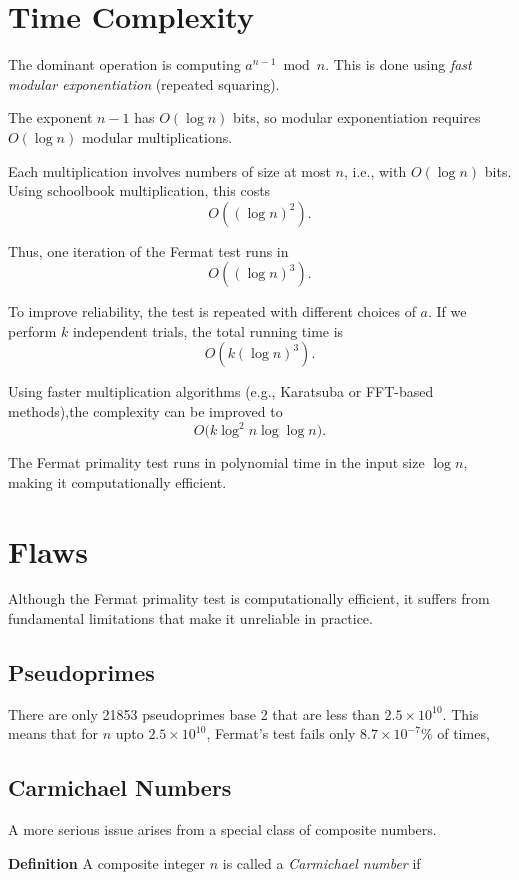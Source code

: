 \documentclass{article}
\newcommand{\bld}[1]{\textbf{#1}}
\begin{document}
\section*{Time Complexity}
The dominant operation is computing $a^{n-1} \bmod n$. This is done using
\emph{fast modular exponentiation} (repeated squaring).

The exponent $n-1$ has $O(\log n)$ bits, so modular exponentiation requires
$O(\log n)$ modular multiplications.

Each multiplication involves numbers of size at most $n$, i.e., with $O(\log n)$ bits.
Using schoolbook multiplication, this costs
\[
O((\log n)^2).
\]

Thus, one iteration of the Fermat test runs in
\[
O((\log n)^3).
\]

To improve reliability, the test is repeated with different choices of $a$.
If we perform $k$ independent trials, the total running time is
\[
O(k (\log n)^3).
\]

Using faster multiplication algorithms (e.g., Karatsuba or FFT-based methods),the complexity can be improved to
\[
O\big(k \log^2 n \log \log n\big).
\]

The Fermat primality test runs in polynomial time in the input size $\log n$, making it computationally efficient.

\section*{Flaws}

Although the Fermat primality test is computationally efficient, it suffers from
fundamental limitations that make it unreliable in practice.

\subsection*{Pseudoprimes}

There are only 21853 pseudoprimes base 2 that are less than $2.5\times10^{10}$. This means that for $n$ upto $2.5\times10^{10}$, Fermat's test fails only $8.7\times{10^{-7}}\%$ of times, 


\subsection*{Carmichael Numbers}

A more serious issue arises from a special class of composite numbers.

\bld{Definition} A composite integer $n$ is called a \emph{Carmichael number} if
\end{document}

